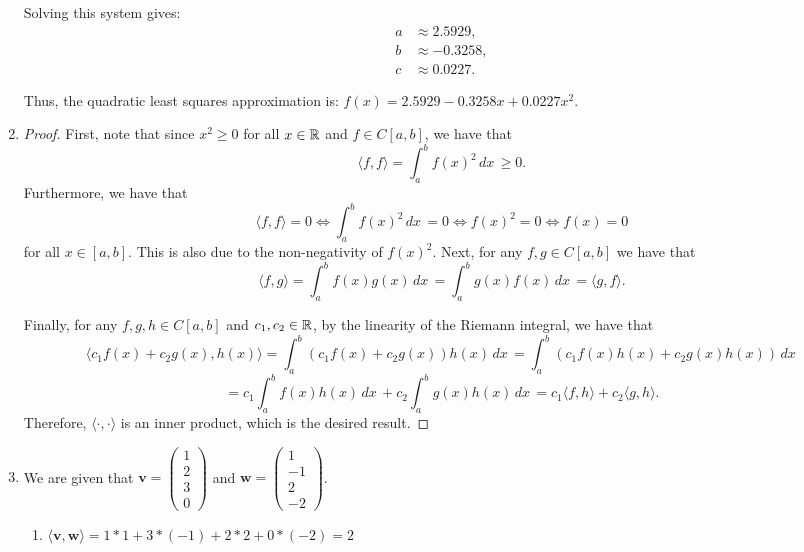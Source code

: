 \documentclass[12pt]{article}
\begin{document}
\begin{enumerate}[leftmargin=0em]
  Solving this system gives:
  \begin{align}
  a &\approx 2.5929, \\
  b &\approx -0.3258, \\
  c &\approx 0.0227.
  \end{align}

  Thus, the quadratic least squares approximation is:
  \(f(x) = 2.5929 - 0.3258x + 0.0227x^2.\)
  
  \item
  \begin{proof}
    First, note that since $x^2\geq 0$ for all $x\in \mathbb{R}$ and $f\in C[a,b]$, we have that
    \[\langle f,f \rangle= \int_{a}^{b}f(x)^2\, dx\, \geq 0.\]
    Furthermore, we have that
    \[\langle f, f\rangle = 0 \iff \int_{a}^{b}f(x)^2\, dx\, = 0 \iff f(x)^2 = 0 \iff f(x) = 0\]
    for all $x\in [a,b]$. This is also due to the non-negativity of $f(x)^2$. Next, for any $f,g\in C[a,b]$ we have that
    \[\langle f, g \rangle = \int_{a}^{b} f(x)g(x)\, dx\, = \int_{a}^{b} g(x)f(x)\, dx\, = \langle g, f \rangle.\]

    \noindent Finally, for any $f,g,h \in C[a,b]$ and $c_{1},c_{2}\in \mathbb{R}$, by the linearity of the Riemann integral, we have that
    \[\langle c_{1}f(x)+c_{2}g(x), h(x)\rangle = \int_{a}^{b} (c_{1}f(x)+c_{2}g(x))h(x)\, dx\, = \int_{a}^{b} (c_{1}f(x)h(x)+c_{2}g(x)h(x))\, dx\,\] 
    \[= c_{1}\int_{a}^{b} f(x)h(x)\, dx\, +c_{2}\int_{a}^{b} g(x)h(x)\, dx\, = c_{1}\langle f,h\rangle+c_{2} \langle g , h\rangle.\]
    Therefore, $\langle \cdot, \cdot \rangle$ is an inner product, which is the desired result. 
  \end{proof}
  
  \item
  We are given that $\mathbf{v} = \begin{pmatrix}
    1\\
    2\\
    3\\
    0
  \end{pmatrix}$ and
  $\mathbf{w} = \begin{pmatrix}
    1\\
    -1\\
    2\\
    -2
  \end{pmatrix}$.
  \begin{enumerate}[leftmargin=!]
    \item $\langle \mathbf{v} , \mathbf{w} \rangle = 1 * 1 + 3 * (-1) + 2 * 2 + 0 * (-2) = 2$


\end{enumerate}
\end{enumerate}
\end{document}
